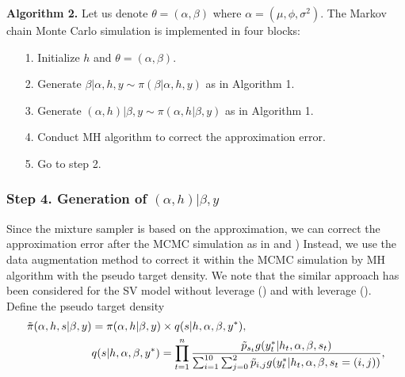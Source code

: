 \noindent
\textbf{Algorithm 2.}
Let us denote $\theta = (\alpha,\beta)$ where $\alpha = (\mu,\phi,\sigma^2)$.
The Markov chain Monte Carlo simulation is implemented in four blocks:

\begin{itemize}
    \item[1.] Initialize $h$ and $\theta=(\alpha,\beta)$.
    \item[2.] Generate $\beta|\alpha,h, y \sim \pi(\beta|\alpha,h, y)$ as in Algorithm 1.
    \item[3.] Generate $(\alpha,h)|\beta, y \sim \pi(\alpha,h|\beta, y)$ as in Algorithm 1.
    \item[4.] Conduct MH algorithm to correct the approximation error.
    \item[5.] Go to step 2.
\end{itemize}
\subsubsection*{Step 4. Generation of $(\alpha,h)|\beta,y$}
Since the mixture sampler is based on the approximation, we can correct the approximation error after the MCMC simulation as in \cite{KimShephardChib(98)} and  \cite{OmoriChibShephardNakajima(07)}) Instead, we use the data augmentation method to correct it within the MCMC simulation by MH algorithm with the pseudo target density. We note that the similar approach has been considered for the SV model without leverage (\cite{DelPrimiceri(15)}) and with leverage (\cite{TakahashiOmoriWatanabe(23)}). 
Define the pseudo target density
\begin{align*}
    \Tilde{\pi}(\alpha,h,s|\beta,y) &= \pi(\alpha, h|\beta,y) \times q(s|h,\alpha,\beta, y^*), \\
    &q(s|h,\alpha,\beta, y^*) = \prod_{t=1}^n \frac{\Tilde{p}_{s_t} g(y_t^*| h_t, \alpha,\beta, s_t)}{\sum_{i=1}^{10}\sum_{j=0}^2 \Tilde{p}_{i,j} g(y_t^*| h_t, \alpha,\beta, s_t=(i,j))}, 
\end{align*}

